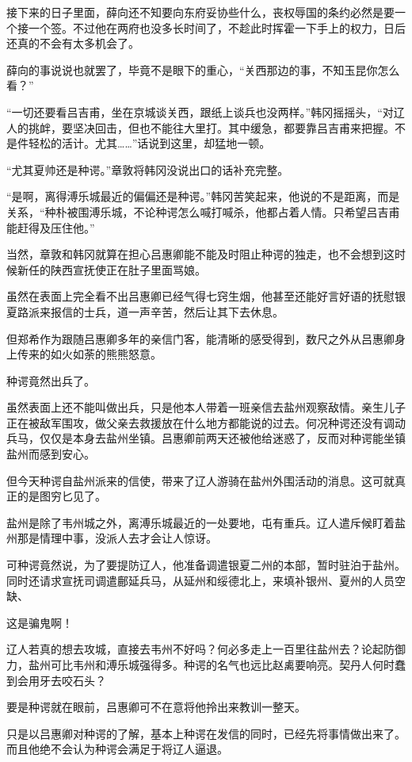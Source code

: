 接下来的日子里面，薛向还不知要向东府妥协些什么，丧权辱国的条约必然是要一个接一个签。不过他在两府也没多长时间了，不趁此时挥霍一下手上的权力，日后还真的不会有太多机会了。

薛向的事说说也就罢了，毕竟不是眼下的重心，“关西那边的事，不知玉昆你怎么看？”

“一切还要看吕吉甫，坐在京城谈关西，跟纸上谈兵也没两样。”韩冈摇摇头，“对辽人的挑衅，要坚决回击，但也不能往大里打。其中缓急，都要靠吕吉甫来把握。不是件轻松的活计。尤其……”话说到这里，却猛地一顿。

“尤其夏帅还是种谔。”章敦将韩冈没说出口的话补充完整。

“是啊，离得溥乐城最近的偏偏还是种谔。”韩冈苦笑起来，他说的不是距离，而是关系，“种朴被围溥乐城，不论种谔怎么喊打喊杀，他都占着人情。只希望吕吉甫能赶得及压住他。”

当然，章敦和韩冈就算在担心吕惠卿能不能及时阻止种谔的独走，也不会想到这时候新任的陕西宣抚使正在肚子里面骂娘。

虽然在表面上完全看不出吕惠卿已经气得七窍生烟，他甚至还能好言好语的抚慰银夏路派来报信的士兵，道一声辛苦，然后让其下去休息。

但郑希作为跟随吕惠卿多年的亲信门客，能清晰的感受得到，数尺之外从吕惠卿身上传来的如火如荼的熊熊怒意。

种谔竟然出兵了。

虽然表面上还不能叫做出兵，只是他本人带着一班亲信去盐州观察敌情。亲生儿子正在被敌军围攻，做父亲去救援放在什么地方都能说的过去。何况种谔还没有调动兵马，仅仅是本身去盐州坐镇。吕惠卿前两天还被他给迷惑了，反而对种谔能坐镇盐州而感到安心。

但今天种谔自盐州派来的信使，带来了辽人游骑在盐州外围活动的消息。这可就真正的是图穷匕见了。

盐州是除了韦州城之外，离溥乐城最近的一处要地，屯有重兵。辽人遣斥候盯着盐州那是情理中事，没派人去才会让人惊讶。

可种谔竟然说，为了要提防辽人，他准备调遣银夏二州的本部，暂时驻泊于盐州。同时还请求宣抚司调遣鄜延兵马，从延州和绥德北上，来填补银州、夏州的人员空缺、

这是骗鬼啊！

辽人若真的想去攻城，直接去韦州不好吗？何必多走上一百里往盐州去？论起防御力，盐州可比韦州和溥乐城强得多。种谔的名气也远比赵禼要响亮。契丹人何时蠢到会用牙去咬石头？

要是种谔就在眼前，吕惠卿可不在意将他拎出来教训一整天。

只是以吕惠卿对种谔的了解，基本上种谔在发信的同时，已经先将事情做出来了。而且他绝不会认为种谔会满足于将辽人逼退。

